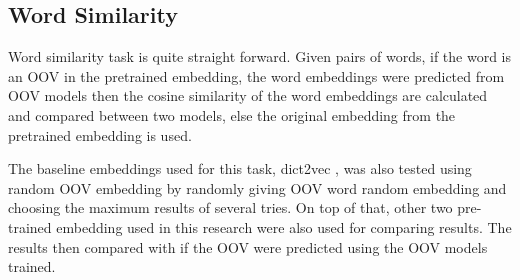     \subsection{Word Similarity}
        Word similarity task is quite straight forward. Given pairs of
        words, if the word is an OOV in the pretrained embedding, the
        word embeddings were predicted from OOV models then the cosine
        similarity of the word embeddings are calculated and compared
        between two models, else the original embedding from the
        pretrained embedding is used. 
        
        The baseline embeddings used for this task, dict2vec
        \citep{dict2vect2017tissier}, was also tested using random OOV
        embedding by randomly giving OOV word random embedding and
        choosing the maximum results of several tries. On top of that,
        other two pre-trained embedding used in this research were
        also used for comparing results. The results then compared
        with if the OOV were predicted using the OOV models trained.